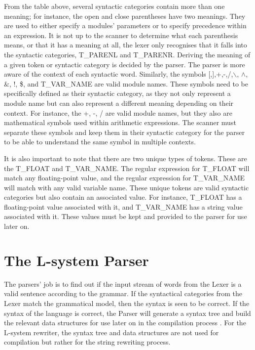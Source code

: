 \noindent
From the table above, several syntactic categories contain more than one meaning; for instance, the open and close parentheses have two meanings. They are used to either specify a modules' parameters or to specify precedence within an expression. It is not up to the scanner to determine what each parenthesis means, or that it has a meaning at all, the lexer only recognises that it falls into the syntactic categories, T\_PARENL and T\_PARENR. Deriving the meaning of a given token or syntactic category is decided by the parser. The parser is more aware of the context of each syntactic word. Similarly, the symbols [,],+,-,/,$\backslash$, $\land$, $\&$, !, \$, and T\_VAR\_NAME are valid module names. These symbols need to be specifically defined as their syntactic category, as they not only represent a module name but can also represent a different meaning depending on their context. For instance, the +, -, / are valid module names, but they also are mathematical symbols used within arithmetic expressions. The scanner must separate these symbols and keep them in their syntactic category for the parser to be able to understand the same symbol in multiple contexts. 

It is also important to note that there are two unique types of tokens. These are the T\_FLOAT and T\_VAR\_NAME. The regular expression for T\_FLOAT will match any floating-point value, and the regular expression for T\_VAR\_NAME will match with any valid variable name. These unique tokens are valid syntactic categories but also contain an associated value. For instance, T\_FLOAT has a floating-point value associated with it, and T\_VAR\_NAME has a string value associated with it. These values must be kept and provided to the parser for use later on.


\section{The L-system Parser} \label{parser}

The parsers' job is to find out if the input stream of words from the \gls{Lexer} is a valid sentence according to the grammar. If the syntactical categories from the \gls{Lexer} match the grammatical model, then the syntax is seen to be correct. If the syntax of the language is correct, the \gls{Parser} will generate a syntax tree and build the relevant data structures for use later on in the compilation process \cite{cooper2011engineering}. For the L-system rewriter, the syntax tree and data structures are not used for compilation but rather for the string rewriting process. 
 


